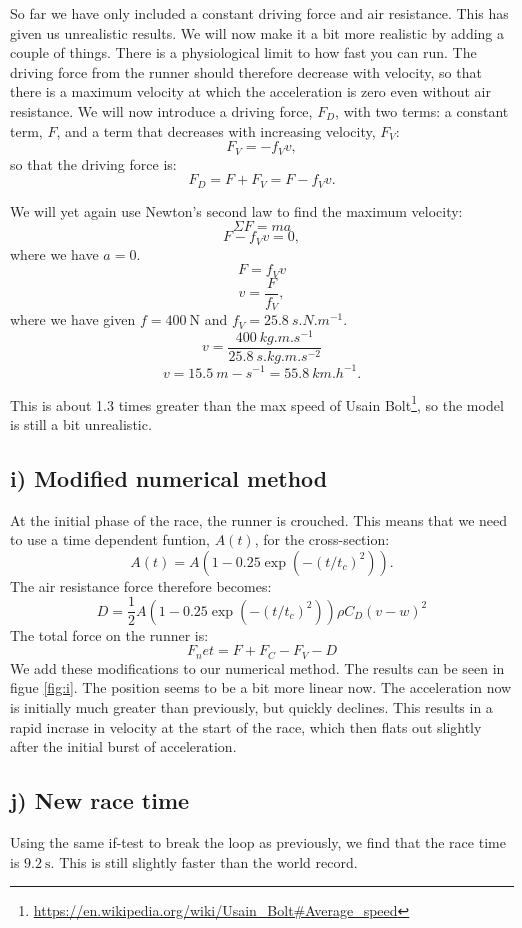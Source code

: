 \documentclass[a4paper,10pt,english]{article}
\begin{document}
So far we have only included a constant driving force and air resistance. This has given us unrealistic results. We will now make it a bit more realistic by adding a couple of things.
There is a physiological limit to how fast you can run. The driving force from the runner should therefore decrease with velocity, so that there is a maximum velocity at which the acceleration is zero even without air resistance. We will now introduce a driving force, $F_D$, with two terms: a constant term, $F$, and a term that decreases with increasing velocity, $F_V$:
\[F_V=-f_V v,\]
so that the driving force is:
\[F_D=F+F_V=F-f_V v.\]

We will yet again use Newton's second law to find the maximum velocity:
\[\Sigma F=ma\]
\[F-f_V v=0,\]
where we have $a=0$.
\[F=f_V v\]
\[v=\frac{F}{f_V},\]
where we have given $f=\SI{400}{\newton}$ and $f_V=\SI{25.8}{s.N.m^{-1}}$.
\[v=\frac{\SI{400}{kg.m.s^{-1}}}{\SI{25.8}{s.kg.m.s^{-2}}}\]
\[v=\SI{15.5}{m-s^{-1}}=\SI{55.8}{km.h^{-1}}.\]

This is about 1.3 times greater than the max speed of Usain Bolt\footnote{\url{https://en.wikipedia.org/wiki/Usain_Bolt\#Average_speed}}, so the model is still a bit unrealistic.

\subsection*{i) Modified numerical method}

At the initial phase of the race, the runner is crouched. This means that we need to use a time dependent funtion, $A(t)$, for the cross-section:
\[A(t)=A(1-0.25\exp (-(t/t_c)^2 )).\]
The air resistance force therefore becomes:
\[D=\frac{1}{2}A(1-0.25\exp (-(t/t_c)^2 ))\rho C_D (v-w)^2\]
The total force on the runner is:
\[F_net = F+F_C -F_V -D\]
We add these modifications to our numerical method. The results can be seen in figue \ref{fig:i}. The position seems to be a bit more linear now. The acceleration now is initially much greater than previously, but quickly declines. This results in a rapid incrase in velocity at the start of the race, which then flats out slightly after the initial burst of acceleration.

\subsection*{j) New race time}
Using the same if-test to break the loop as previously, we find that the race time is $\SI{9.2}{\second}$. This is still slightly faster than the world record.
\end{document}
